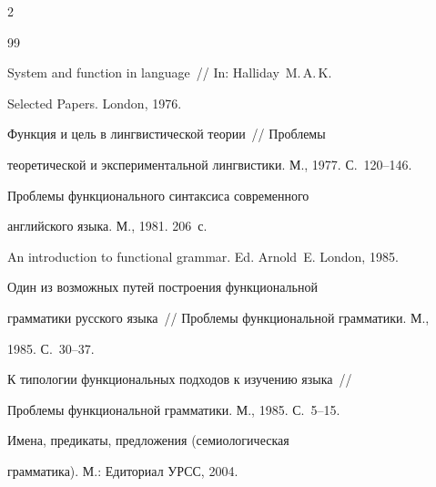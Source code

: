 \begin{multicols}{2}
{{\begin{thebibliography}{99}




System and function in language~// In: Halliday~M.\,A.\,K.


Selected Papers. London, 1976.









Функция и цель в лингвистической теории~// Проблемы


теоретической и экспериментальной лингвистики. М., 1977. С.~120--146.









Проблемы функционального синтаксиса современного


английского языка. М., 1981. 206~с.









An introduction to functional grammar. Ed. Arnold~E. London, 1985.









Один из возможных путей построения функциональной


грамматики русского языка~// Проблемы функциональной грамматики. М.,


1985. С.~30--37.









К типологии функциональных подходов к изучению языка~//


Проблемы функциональной грамматики. М., 1985. С.~5--15.









Имена, предикаты, предложения (семиологическая


грамматика). М.: Едиториал УРСС, 2004.






\end{thebibliography}}}
\end{multicols}
